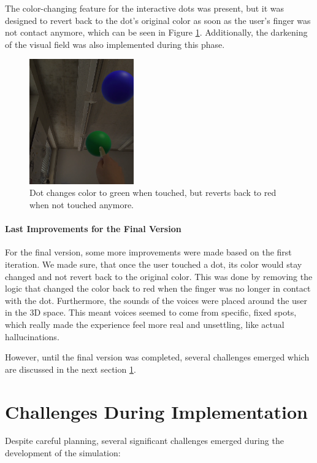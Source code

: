 The color-changing feature for the interactive dots was present, but it was designed to revert back to the dot's original color as soon as the user's finger was not contact anymore, which can be seen in Figure \ref{fig:dot-green}. Additionally, the darkening of the visual field was also implemented during this phase.

\begin{figure}[H]
    \centering
    \includegraphics[width=0.4\textwidth]{../../Figures/dot-color-green.png}
    \caption{Dot changes color to green when touched, but reverts back to red when not touched anymore.}
    \label{fig:dot-green}
\end{figure}

\paragraph{Last Improvements for the Final Version}
For the final version, some more improvements were made based on the first iteration. We made sure, that once the user touched a dot, its color would stay changed and not revert back to the original color. This was done by removing the logic that changed the color back to red when the finger was no longer in contact with the dot. Furthermore, the sounds of the voices were placed around the user in the 3D space. This meant voices seemed to come from specific, fixed spots, which really made the experience feel more real and unsettling, like actual hallucinations.

\vspace{1em}

However, until the final version was completed, several challenges emerged which are discussed in the next section \ref{sec:challengesimplementation}.

\section{Challenges During Implementation} 
\label{sec:challengesimplementation}
Despite careful planning, several significant challenges emerged during the development of the simulation:

